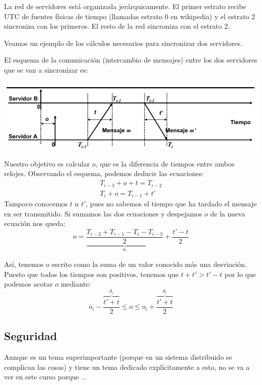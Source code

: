 La red de servidores está organizada jerárquicamente. El primer estrato recibe UTC de fuentes  físicas de tiempo (llamadas estrato 0 en wikipedia) y el estrato 2 sincroniza con los primeros. El resto de la red sincroniza con el estrato 2.

Veamos un ejemplo de los cálculos necesarios para sincronizar dos servidores.

\begin{example}
El esquema de la comunicación (intercambio de mensajes) entre los dos servidores que se van a sincronizar es:
\begin{center}
\includegraphics[width=1\textwidth]{img/ntp.png}
\end{center}

Nuestro objetivo es calcular $o$, que es la diferencia de tiempos entre ambos relojes. Observando el esquema, podemos deducir las ecuaciones:
\begin{align}
T_{i-3}+o+t=T_{i-2}\\
T_{i}+o=T_{i-1}+t'
\end{align}
Tampoco conocemos $t$ n $t'$, pues no sabemos el tiempo que ha tardado el mensaje en ser transmitido. Si sumamos las dos ecuaciones y despejamos $o$ de la nueva ecuación nos queda:
\[o=\underbrace{\frac{T_{i-2}+T_{i-1}-T_i-T_{i-3}}{2}}_{o_i}+\frac{t'-t}{2}\]

Así, tenemos $o$ escrito como la suma de un valor conocido más una desviación. Puesto que todos los tiempos son positivos, tenemos que $t+t'>t'-t$ por lo que podemos acotar $o$ mediante:
\[o_i-\frac{\overbrace{t'+t}^{d_i}}{2}\leq o \leq o_i + \frac{\overbrace{t'+t}^{d_i}}{2}\]
\end{example}

\subsection{Seguridad}
Aunque es un tema superimportante (porque en un sistema distribuido se complican las cosas) y tiene un tema dedicado explícitamente a esto, no se va a ver en este curso porque ...

